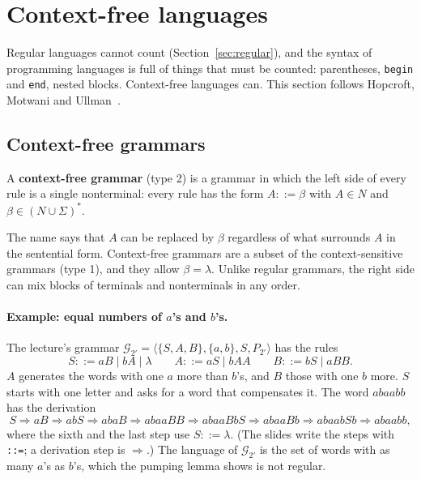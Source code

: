 \section{Context-free languages}
\label{sec:cfl}

Regular languages cannot count (Section~\ref{sec:regular}), and the syntax of
programming languages is full of things that must be counted: parentheses,
\texttt{begin} and \texttt{end}, nested blocks. Context-free languages can.
This section follows Hopcroft, Motwani and
Ullman~\cite[Ch.~5--7]{hopcroft2007automata}.

\subsection{Context-free grammars}

\begin{definition}
A \textbf{context-free grammar} (type 2) is a grammar in which the left side of
every rule is a single nonterminal: every rule has the form $A ::= \beta$ with
$A \in N$ and $\beta \in (N \cup \Sigma)^*$.
\end{definition}

The name says that $A$ can be replaced by $\beta$ regardless of what surrounds
$A$ in the sentential form. Context-free grammars are a subset of the
context-sensitive grammars (type 1), and they allow $\beta = \lambda$. Unlike
regular grammars, the right side can mix blocks of terminals and
nonterminals in any order.

\paragraph{Example: equal numbers of $a$'s and $b$'s.} The lecture's grammar
$\mathcal{G}_{2'} = \langle \{S, A, B\}, \{a, b\}, S, P_{2'} \rangle$ has the rules
\[
S ::= aB \mid bA \mid \lambda \qquad A ::= aS \mid bAA \qquad B ::= bS \mid aBB.
\]
$A$ generates the words with one $a$ more than $b$'s, and $B$ those with one
$b$ more. $S$ starts with one letter and asks for a word that compensates it.
The word $abaabb$ has the derivation
\[
S \Rightarrow aB \Rightarrow abS \Rightarrow abaB \Rightarrow abaaBB \Rightarrow abaaBbS
  \Rightarrow abaaBb \Rightarrow abaabSb \Rightarrow abaabb,
\]
where the sixth and the last step use $S ::= \lambda$. (The slides write the
steps with \texttt{::=}; a derivation step is $\Rightarrow$.) The language of
$\mathcal{G}_{2'}$ is the set of words with as many $a$'s as $b$'s, which the
pumping lemma shows is not regular.

